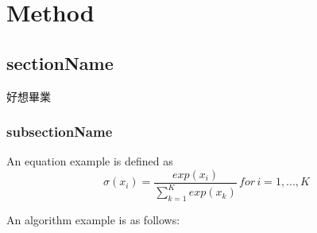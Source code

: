 \chapter{Method}
\section{sectionName}
好想畢業

\subsection{subsectionName}
An equation example is defined as
\begin{equation}
\sigma(x_{i}) =\frac{exp(x_{i})}{\sum_{k=1}^{K}exp(x_{k})} \, for \, i=1,...,K
\end{equation}


An algorithm example is as follows:

